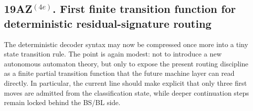 \subsection*{19AZ$^{(4e)}$. First finite transition function for deterministic residual-signature routing}
\label{sec:first-finite-transition-function-deterministic-residual-signature-routing}
The deterministic decoder syntax may now be compressed once more into a tiny state transition rule. The point is again modest: not to introduce a new autonomous automaton theory, but only to expose the present routing discipline as a finite partial transition function that the future machine layer can read directly. In particular, the current line should make explicit that only three first moves are admitted from the classification state, while deeper continuation steps remain locked behind the BS/BL side.

